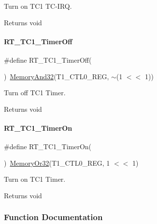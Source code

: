 Turn on T\+C1 T\+C-\/\+I\+RQ. 

\begin{DoxyReturn}{Returns}
void 
\end{DoxyReturn}
\mbox{\label{a00044_a1bccbc833364c4f1c6ce63a758136817}} 
\paragraph{\texorpdfstring{R\+T\+\_\+\+T\+C1\+\_\+\+Timer\+Off}{RT\_TC1\_TimerOff}}
{\footnotesize\ttfamily \#define R\+T\+\_\+\+T\+C1\+\_\+\+Timer\+Off(\begin{DoxyParamCaption}{ }\end{DoxyParamCaption})~\mbox{\hyperlink{a00020_a5c1a2bd4c1bd4c2f429d8042a45327ff}{Memory\+And32}}(T1\+\_\+\+C\+T\+L0\+\_\+\+R\+EG, $\sim$(1 $<$$<$ 1))}



Turn off T\+C1 Timer. 

\begin{DoxyReturn}{Returns}
void 
\end{DoxyReturn}
\mbox{\label{a00044_ac76393581e0b1d58a9628139db72cdaf}} 
\paragraph{\texorpdfstring{R\+T\+\_\+\+T\+C1\+\_\+\+Timer\+On}{RT\_TC1\_TimerOn}}
{\footnotesize\ttfamily \#define R\+T\+\_\+\+T\+C1\+\_\+\+Timer\+On(\begin{DoxyParamCaption}{ }\end{DoxyParamCaption})~\mbox{\hyperlink{a00020_a9ea92ebccdef6bdaca4d00210cc7266d}{Memory\+Or32}}(T1\+\_\+\+C\+T\+L0\+\_\+\+R\+EG, 1 $<$$<$ 1)}



Turn on T\+C1 Timer. 

\begin{DoxyReturn}{Returns}
void 
\end{DoxyReturn}


\subsubsection{Function Documentation}
\mbox{\label{a00044_afd59a0331a55d7e264c4848e3ddbe72f}} 

